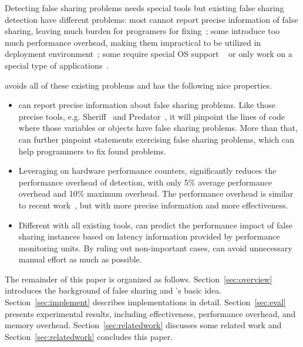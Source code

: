 Detecting false sharing problems needs special tools but existing false sharing detection have different problems: most cannot report precise information of false sharing, leaving much burden for programers for fixing~\cite{falseshare:binaryinstrumentation1,detect:ptu,detect:intel,falseshare:binaryinstrumentation2,DProf, qinzhao, OSdetection, mldetect, Wicaksono11detectingfalse, openmp}; some introduce too much performance overhead, making them impractical to be utilized in deployment environment~\cite{falseshare:binaryinstrumentation1,falseshare:binaryinstrumentation2,falseshare:simulator, Predator}; some require special OS support ~\cite{OSdetection} or only work on a special type of applications~\cite{sheriff}.

\vspace{0.2in}

\cheetah{} avoids all of these existing problems and has the following nice properties.

\begin{itemize} 
\item \cheetah{} can report precise information about false sharing problems. Like those precise tools, e.g. Sheriff~\cite{sheriff} and Predator~\cite{Predator}, it will pinpoint the lines of code where those variables or objects have false sharing problems. More than that, \cheetah{} can further pinpoint statements exercising false sharing problems, which can help programmers to fix found problems. 

\item Leveraging on hardware performance counters, \cheetah{} significantly reduces the performance overhead of detection, with only 5\% average performance overhead and 10\% maximum overhead. The performance overhead is similar to recent work~\cite{mldetect, openmp}, but with more precise information and more effectiveness.
  
\item Different with all existing tools, \Cheetah{} can predict the performance impact of false sharing instances based on latency information provided by performance monitoring units. By ruling out non-important cases, \Cheetah{} can avoid unnecessary manual effort as much as possible. 

\end{itemize}

The remainder of this paper is organized as follows. Section~\ref{sec:overview} introduces the background of false sharing and \cheetah{}'s basic idea. Section~\ref{sec:implement} describes implementations in detail. Section~\ref{sec:eval} presents experimental results, including effectiveness, performance overhead, and memory overhead. Section~\ref{sec:relatedwork} discusses some related work and Section~\ref{sec:relatedwork} concludes this paper. 




